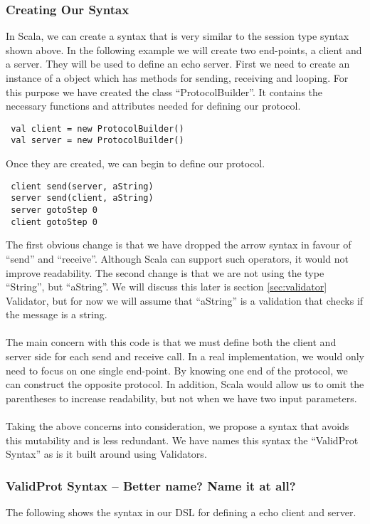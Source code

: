 \subsubsection{Creating Our Syntax}
In Scala, we can create a syntax that is very similar to the session type syntax shown above. In the following example we will create two end-points, a client and a server. They will be used to define an echo server. First we need to create an instance of a object which has methods for sending, receiving and looping. For this purpose we have created the class ``ProtocolBuilder''. It contains the necessary functions and attributes needed for defining our protocol.
\begin{lstlisting}
 val client = new ProtocolBuilder()
 val server = new ProtocolBuilder()
\end{lstlisting}
Once they are created, we can begin to define our protocol.
\begin{lstlisting}
 client send(server, aString)
 server send(client, aString)
 server gotoStep 0
 client gotoStep 0 
\end{lstlisting}
The first obvious change is that we have dropped the arrow syntax in favour of ``send'' and ``receive''. Although Scala can support such operators, it would not improve readability. The second change is that we are not using the type ``String'', but ``aString''. We will discuss this later is section {\ref{sec:validator} Validator}, but for now we will assume that ``aString'' is a validation that checks if the message is a string.   
\\\\
The main concern with this code is that we must define both the client and server side for each send and receive call. In a real implementation, we would only need to focus on one single end-point. By knowing one end of the protocol, we can construct the opposite protocol. In addition, Scala would allow us to omit the parentheses to increase readability, but not when we have two input parameters.
\\\\
Taking the above concerns into consideration, we propose a syntax that avoids this mutability and is less redundant. We have names this syntax the ``ValidProt Syntax'' as is it built around using Validators. 

\subsubsection{ValidProt Syntax -- Better name? Name it at all?}
The following shows the syntax in our DSL for defining a echo client and server.

